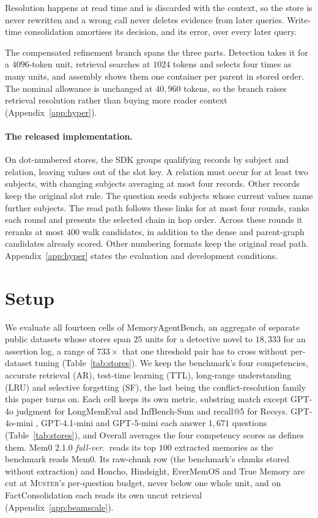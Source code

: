 \documentclass{article}
\newcommand{\sys}{\textsc{Muster}}
\begin{document}
Resolution happens at read time and is discarded with the context, so the store is never rewritten and a
wrong call never deletes evidence from later queries. Write-time consolidation amortises its decision, and
its error, over every later query.

The compensated refinement branch spans the three parts. Detection takes it for a $4096$-token unit, retrieval searches at $1024$ tokens and selects four times as many units, and assembly shows them one container per parent in stored order. The nominal allowance is unchanged at $40{,}960$ tokens, so the branch raises retrieval resolution rather than buying more reader context (Appendix~\ref{app:hyper}).

\paragraph{The released implementation.} On dot-numbered stores, the SDK groups qualifying records by subject and relation, leaving values out of the slot key. A relation must occur for at least two subjects, with changing subjects averaging at most four records. Other records keep the original slot rule. The question seeds subjects whose current values name further subjects. The read path follows these links for at most four rounds, ranks each round and presents the selected chain in hop order. Across these rounds it reranks at most $400$ walk candidates, in addition to the dense and parent-graph candidates already scored. Other numbering formats keep the original read path. Appendix~\ref{app:hyper} states the evaluation and development conditions.

\section{Setup}\label{sec:setup}

We evaluate all fourteen cells of MemoryAgentBench, an aggregate of separate public datasets whose stores span $25$ units for a detective novel to $18{,}333$ for an assertion log, a range of $733\times$ that one threshold pair has to cross without per-dataset tuning (Table~\ref{tab:stores}). We keep the benchmark's four competencies, accurate retrieval (AR), test-time learning (TTL), long-range understanding (LRU) and selective forgetting (SF), the last being the conflict-resolution family this paper turns on. Each cell keeps its own metric, substring match except GPT-4o judgment for LongMemEval and InfBench-Sum and recall@5 for Recsys. GPT-4o-mini \cite{gpt4omini}, GPT-4.1-mini \cite{gpt41} and GPT-5-mini \cite{gpt5} each answer $1{,}671$ questions (Table~\ref{tab:stores}), and Overall averages the four competency scores as \cite{mab} defines them. Mem0 2.1.0 \emph{full-ver.}\ reads its top $100$ extracted memories as the benchmark reads Mem0. Its raw-chunk row (the benchmark's chunks stored without extraction) and Honcho, Hindsight, EverMemOS and True Memory are cut at \sys{}'s per-question budget, never below one whole unit, and on FactConsolidation each reads its own uncut retrieval (Appendix~\ref{app:beamscale}).
\end{document}

